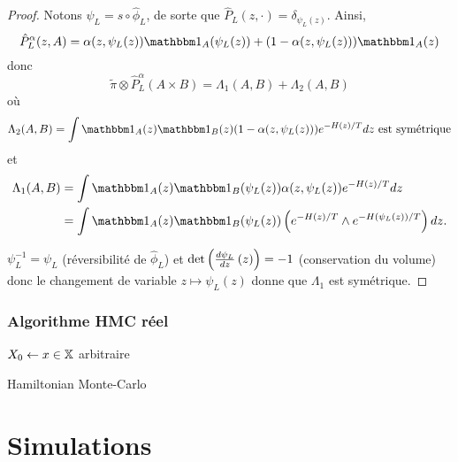 \documentclass[10pt]{beamer}
\begin{document}
\begin{frame}
	\begin{proof}
		\small
		Notons $\psi_L = s \circ \hat \phi_L$, de sorte que $\hat P_L(z,\cdot) = \delta_{\psi_L(z)}$. Ainsi,
		$$
		\hat P_L^\alpha(z,A) = \alpha(z,\psi_L(z)) \ind_A(\psi_L(z)) + (1-\alpha(z,\psi_L(z))) \ind_A(z)
		$$
		donc
		$$
		\widetilde \pi \otimes \hat P_L^\alpha (A \times B)
		=
		\Lambda_1(A,B) + \Lambda_2(A,B)
		$$
		où
		$$
		\Lambda_2(A,B) = \int \ind_A(z) \ind_B(z) (1-\alpha(z,\psi_L(z))) e^{-H(z)/T} dz \text{ est sym\'etrique}
		$$
		et
		$$
		\begin{aligned}
		\Lambda_1(A,B)
		&= \int \ind_A(z) \ind_B(\psi_L(z)) \alpha(z,\psi_L(z)) e^{-H(z)/T} dz\\
		&= \int \ind_A(z) \ind_B(\psi_L(z)) \left( e^{-H(z)/T} \wedge e^{-H(\psi_L(z))/T} \right) dz.
		\end{aligned}
		$$

		$\psi_L^{-1} = \psi_L$ (réversibilité de $\hat \phi_L$) et $\det \left( \frac{d \psi_L}{d z} \left( z \right) \right) = -1$ (conservation du volume) donc le changement de variable $z \mapsto \psi_L(z)$ donne que $\Lambda_1$ est symétrique.
	\end{proof}
\end{frame}
 
\begin{frame}
  \frametitle{Algorithme HMC réel}
        \begin{center}
        \small
		\begin{algorithm}[H]
			$X_0 \leftarrow x \in \mathbb{X}$ arbitraire\;
			\caption{Hamiltonian Monte-Carlo}
			\label{algo:HMC}
		\end{algorithm}
        \end{center}
\end{frame}
 
\section{Simulations}
 
\end{document}
